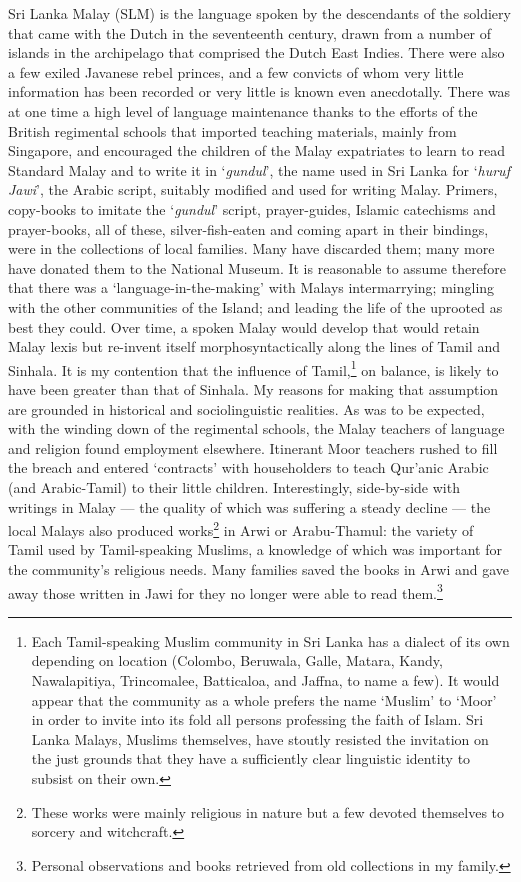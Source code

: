 Sri Lanka Malay (SLM) is the language spoken by the descendants of the soldiery that came with the Dutch in the seventeenth century, drawn from a number of islands in the archipelago that comprised the Dutch East Indies.
There were also a few exiled Javanese rebel princes, and a few convicts of whom very little information has been recorded or very little is known even anecdotally. There was at one time a high level of language maintenance thanks to the efforts of the British regimental schools that imported teaching materials, mainly from Singapore, and encouraged the children of the Malay expatriates to learn to read Standard Malay and to write it in `\textit{gundul}', the name used in Sri Lanka for `\textit{huruf Jawi}', the Arabic script, suitably modified and used for writing Malay. Primers, copy-books to imitate the `\textit{gundul}' script, prayer-guides, Islamic catechisms and prayer-books, all of these, silver-fish-eaten and coming apart in their bindings, were in the collections of local families. Many have discarded them; many more have donated them to the National Museum. It is reasonable to assume therefore that there was a `language-in-the-making' with Malays intermarrying; mingling with the other communities of the Island; and leading the life of the uprooted as best they could. Over time, a spoken Malay would develop that would retain Malay lexis but re-invent itself morphosyntactically along the lines of Tamil and Sinhala. It is my contention that the influence of Tamil,\footnote{Each
 Tamil-speaking Muslim community in Sri Lanka has a dialect of its own depending on location (Colombo, Beruwala, Galle, Matara, Kandy, Nawalapitiya, Trincomalee, Batticaloa, and Jaffna, to name a few). It would appear that the community as a whole prefers the name `Muslim' to `Moor' in order to invite into its fold all persons professing the faith of Islam. Sri Lanka Malays, Muslims themselves, have stoutly resisted the invitation on the just grounds that they have a sufficiently clear linguistic identity to subsist on their own. 
} 
on balance, is likely to have been greater than that of Sinhala. My reasons for making that assumption are grounded in historical and sociolinguistic realities. As was to be expected, with the winding down of the regimental schools, the Malay teachers of language and religion found employment elsewhere. Itinerant Moor teachers rushed to fill the breach and entered `contracts' with householders to teach Qur'anic Arabic (and Arabic-Tamil) to their little children. Interestingly, side-by-side with writings in Malay --- the quality of which was suffering a steady decline --- the local Malays also produced works\footnote{These
 works were mainly religious in nature but a few devoted themselves to sorcery and witchcraft.
} 
in Arwi or Arabu-Thamul: the variety of Tamil used by Tamil-speaking Muslims, a knowledge of which was important for the community's religious needs. Many families saved the books in Arwi and gave away those written in Jawi for they no longer were able to read them.\footnote{Personal
 observations and books retrieved from old collections in my family.
} 

